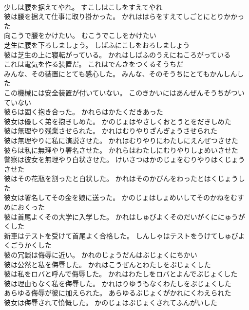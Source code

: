 \documentclass[8pt]{extreport}
\begin{document}
\begin{CJK}{UTF8}{min}
\\	少しは腰を据えてやれ。	すこしはこしをすえてやれ 
\\	彼は腰を据えて仕事に取り掛かった。	かれははらをすえてしごとにとりかかった 
\\	向こうで腰をかけたい。	むこうでこしをかけたい 
\\	芝生に腰を下ろしましょう。	しばふにこしをおろしましょう 
\\	彼は芝生の上に寝転がっている。	かれはしばふのうえにねころがっている 
\\	これは電気を作る装置だ。	これはでんきをつくるそうちだ 
\\	みんな、その装置にとても感心した。	みんな、そのそうちにとてもかんしんした 
\\	この機械には安全装置が付いていない。	このきかいにはあんぜんそうちがついていない 
\\	彼らは固く抱き合った。	かれらはかたくだきあった 
\\	彼女は優しく弟を抱きしめた。	かのじょはやさしくおとうとをだきしめた 
\\	彼は無理やり残業させられた。	かれはむりやりざんぎょうさせられた 
\\	彼は無理やりに私に演説させた。	かれはむりやりにわたしにえんぜつさせた 
\\	彼らは私に無理やり署名させた。	かれらはわたしにむりやりしょめいさせた 
\\	警察は彼女を無理やり白状させた。	けいさつはかのじょをむりやりはくじょうさせた 
\\	彼はその花瓶を割ったと白状した。	かれはそのかびんをわったとはくじょうした 
\\	彼女は署名してその金を娘に送った。	かのじょはしょめいしてそのかねをむすめにおくった 
\\	彼は首尾よくその大学に入学した。	かれはしゅびよくそのだいがくににゅうがくした 
\\	新車はテストを受けて首尾よく合格した。	しんしゃはテストをうけてしゅびよくごうかくした 
\\	彼の冗談は侮辱に近い。	かれのじょうだんはぶじょくにちかい 
\\	彼は公然と私を侮辱した。	かれはこうぜんとわたしをぶじょくした 
\\	彼は私をロバと呼んで侮辱した。	かれはわたしをロバとよんでぶじょくした 
\\	彼は理由もなく私を侮辱した。	かれはりゆうもなくわたしをぶじょくした 
\\	あらゆる侮辱が彼に加えられた。	あらゆるぶじょくがかれにくわえられた 
\\	彼女は侮辱されて憤慨した。	かのじょはぶじょくされてふんがいした 

\end{CJK}
\end{document}
